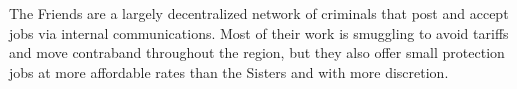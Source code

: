 The Friends are a largely decentralized network of criminals that post and accept jobs via internal communications.
Most of their work is smuggling to avoid tariffs and move contraband throughout the region, but they also offer small protection jobs at more affordable rates than the Sisters and with more discretion.